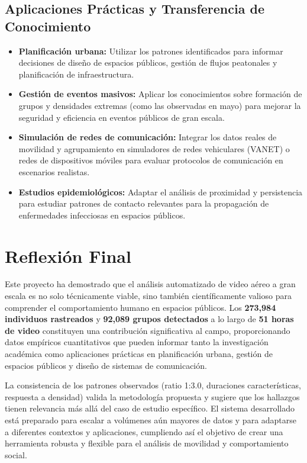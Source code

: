 \subsection{Aplicaciones Prácticas y Transferencia de Conocimiento}
\begin{itemize}
	\item \textbf{Planificación urbana:} Utilizar los patrones identificados para informar decisiones de diseño de espacios públicos, gestión de flujos peatonales y planificación de infraestructura.
	
	\item \textbf{Gestión de eventos masivos:} Aplicar los conocimientos sobre formación de grupos y densidades extremas (como las observadas en mayo) para mejorar la seguridad y eficiencia en eventos públicos de gran escala.
	
	\item \textbf{Simulación de redes de comunicación:} Integrar los datos reales de movilidad y agrupamiento en simuladores de redes vehiculares (VANET) o redes de dispositivos móviles para evaluar protocolos de comunicación en escenarios realistas.
	
	\item \textbf{Estudios epidemiológicos:} Adaptar el análisis de proximidad y persistencia para estudiar patrones de contacto relevantes para la propagación de enfermedades infecciosas en espacios públicos.
\end{itemize}

\section{Reflexión Final}
Este proyecto ha demostrado que el análisis automatizado de video aéreo a gran escala es no solo técnicamente viable, sino también científicamente valioso para comprender el comportamiento humano en espacios públicos. Los \textbf{273,984 individuos rastreados} y \textbf{92,089 grupos detectados} a lo largo de \textbf{51 horas de video} constituyen una contribución significativa al campo, proporcionando datos empíricos cuantitativos que pueden informar tanto la investigación académica como aplicaciones prácticas en planificación urbana, gestión de espacios públicos y diseño de sistemas de comunicación.

La consistencia de los patrones observados (ratio 1:3.0, duraciones características, respuesta a densidad) valida la metodología propuesta y sugiere que los hallazgos tienen relevancia más allá del caso de estudio específico. El sistema desarrollado está preparado para escalar a volúmenes aún mayores de datos y para adaptarse a diferentes contextos y aplicaciones, cumpliendo así el objetivo de crear una herramienta robusta y flexible para el análisis de movilidad y comportamiento social.